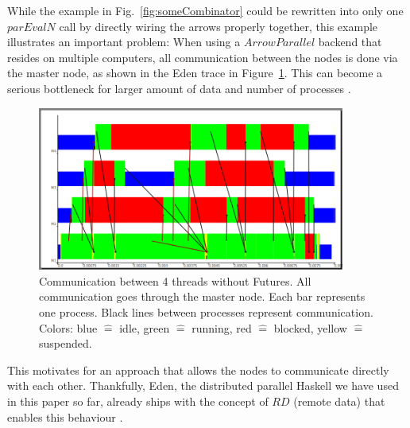 \documentclass{jfp1}
\newcommand{\Conid}[1]{\mathit{#1}}
\newcommand{\Varid}[1]{\mathit{#1}}
\renewcommand{\cite}[1]{\citep{#1}}
\DeclareRobustCommand{\hairspn}{\hspace{1pt}\nolinebreak}%
\DeclareRobustCommand{\eg}{{e.\hairspn{}g.~}}
\begin{document}
While the example in Fig.~\ref{fig:someCombinator} could be rewritten into only one \ensuremath{\Varid{parEvalN}} call by directly wiring the arrows properly together, this example illustrates an important problem: When using a \ensuremath{\Conid{ArrowParallel}} backend that resides on multiple computers, all communication between the nodes is done via the master node, as shown in the Eden trace in Figure~\ref{fig:withoutFutures}. This can become a serious bottleneck %
for larger amount of data and number of processes \citep[showcases][as, \eg]{Berthold2009-fft}.
\begin{figure}[ht]
	\centering
	\includegraphics[width=0.9\textwidth]{images/withoutFutures}
	\caption[without Futures]{Communication between 4 threads without Futures. All communication goes through the master node. Each bar represents one process. Black lines between processes represent communication. Colors: blue $\hat{=}$ idle, green $\hat{=}$ running, red  $\hat{=}$ blocked, yellow $\hat{=}$ suspended.}
	\label{fig:withoutFutures}
\end{figure}

This motivates for an approach that allows the nodes to communicate directly with each other. Thankfully, Eden, the distributed parallel Haskell we have used in this paper so far, already ships with the concept of \ensuremath{\Conid{RD}} (remote data) that enables this behaviour \cite{AlGo03a,Dieterle2010}.
\end{document}

